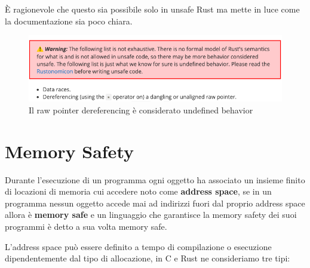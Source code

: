 \documentclass[Lau,binding=0.6cm]{sapthesis}
\begin{document}
È ragionevole che questo sia possibile solo in unsafe Rust ma mette in luce come la documentazione sia poco chiara. 




\begin{figure}[h!t]
    \centering
    \includegraphics[scale=0.52]{images/warning_undefined_behavior.png}
    \caption{Il raw pointer dereferencing è considerato undefined behavior}
    \label{fig:warning}
\end{figure}


\chapter{Memory Safety} \label{chap:memory_safety}

Durante l'esecuzione di un programma ogni oggetto ha associato un insieme finito di locazioni di memoria cui accedere noto come \textbf{address space}, se in un programma nessun oggetto accede mai ad indirizzi fuori dal proprio address space allora è \textbf{memory safe} e un linguaggio che garantisce la memory safety dei suoi programmi è detto a sua volta memory safe.

L'address space può essere definito a tempo di compilazione o esecuzione dipendentemente dal tipo di allocazione, in C e Rust ne consideriamo tre tipi:
\end{document}
